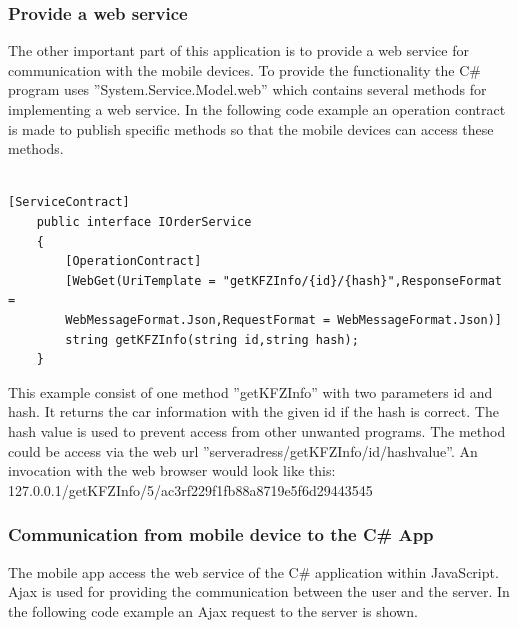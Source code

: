 \newpage
\subsubsection{Provide a web service}

The other important part of this application is to provide a web service for communication with the mobile devices.  To provide the functionality the C\# program uses ''System.Service.Model.web'' which contains several methods for implementing a web service.  In the following code example an operation contract is made to publish specific methods so that the mobile devices can access these methods.
\\\\
\begin{lstlisting}[caption=
????,captionpos=b]
[ServiceContract]
    public interface IOrderService
    {
        [OperationContract]
        [WebGet(UriTemplate = "getKFZInfo/{id}/{hash}",ResponseFormat =           
        WebMessageFormat.Json,RequestFormat = WebMessageFormat.Json)]
        string getKFZInfo(string id,string hash);
    }
\end{lstlisting}

This example consist of one method ''getKFZInfo'' with two parameters id and hash. It returns the car information with the given id if the hash is correct. The hash value is used to prevent access from other unwanted programs. The method could be access via the web url ''serveradress/getKFZInfo/id/hashvalue''. An invocation with the web browser would look like this:  127.0.0.1/getKFZInfo/5/ac3rf229f1fb88a8719e5f6d29443545
\newpage
\subsubsection{Communication from mobile device to the C\# App}

The mobile app access the web service of the C\# application within JavaScript. Ajax is used for providing the communication between the user and the server. In the following code example an Ajax request to the server is shown.


